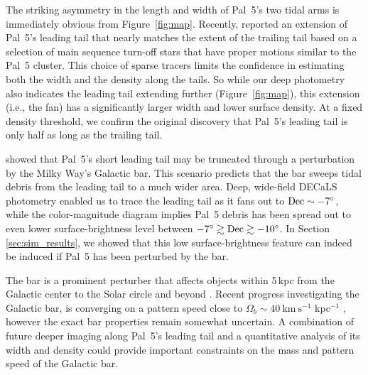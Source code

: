 \documentclass[twocolumn]{aastex62}
\newcommand{\kms}{\ensuremath{\textrm{km}~\textrm{s}^{-1}}}
\begin{document}
The striking asymmetry in the length and width of Pal~5's two tidal arms is immediately obvious from Figure~\ref{fig:map}.
Recently, \citet{Starkman:2019} reported an extension of Pal~5's leading tail that nearly matches the extent of the trailing tail based on a selection of main sequence turn-off stars that have proper motions similar to the Pal~5 cluster.
This choice of sparse tracers limits the confidence in estimating both the width and the density along the tails.
So while our deep photometry also indicates the leading tail extending further (Figure~\ref{fig:map}), this extension (i.e., the fan) has a significantly larger width and lower surface density.
At a fixed density threshold, we confirm the original \citet{Bernard:2016} discovery that Pal~5's leading tail is only half as long as the trailing tail.

\citet{Pearson:2017} showed that Pal~5's short leading tail may be truncated through a perturbation by the Milky Way's Galactic bar.
This scenario predicts that the bar sweeps tidal debris from the leading tail to a much wider area.
Deep, wide-field DECaLS photometry enabled us to trace the leading tail as it fans out to $\rm Dec\sim-7^\circ$, while the color-magnitude diagram implies Pal~5 debris has been spread out to even lower surface-brightness level between $-7^\circ\gtrsim\rm Dec\gtrsim-10^\circ$.
In Section \ref{sec:sim_results}, we showed that this low surface-brightness feature can indeed be induced if Pal~5 has been perturbed by the bar.

The bar is a prominent perturber that affects objects within 5\,kpc from the Galactic center \citep[e.g., the Ophiuchus stream,][]{Price-Whelan:2016b, Hattori:2016} to the Solar circle and beyond \citep[e.g., local phase-space overdensities][]{Hunt:2018, Monari:2019}.
Recent progress investigating the Galactic bar, is converging on a pattern speed close to $\Omega_b \sim 40 ~\kms$ kpc$^{-1}$ \citep[e.g.,][]{Clarke:2019, Sanders:2019, Bovy:2019}, however the exact bar properties remain somewhat uncertain.
A combination of future deeper imaging along Pal~5's leading tail and a quantitative analysis of its width and density could provide important constraints on the mass and pattern speed of the Galactic bar.
\end{document}
